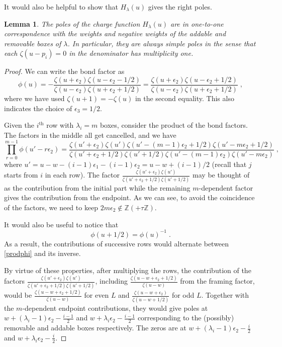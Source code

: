 \documentclass[11pt]{article}
\numberwithin{equation}{section}
\numberwithin{figure}{section}
\numberwithin{table}{section}
\newtheorem{lemma}[theorem]{Lemma}
\begin{document}
It would also be helpful to show that $H_\lambda(u)$ gives the right poles.
\begin{lemma}
	The poles of the charge function $H_\lambda(u)$ are in one-to-one correspondence with the weights and negative weights of the addable and removable boxes of $\lambda$. In particular, they are always simple poles in the sense that each $\zeta(u-p_i)=0$ in the denominator has multiplicity one.
\end{lemma}
\begin{proof}
	We can write the bond factor as
	\begin{equation}
		\phi(u)=-\frac{\zeta(u+\epsilon_2)\zeta(u-\epsilon_2-1/2)}{\zeta(u-\epsilon_2)\zeta(u+\epsilon_2+1/2)}=\frac{\zeta(u+\epsilon_2)\zeta(u-\epsilon_2+1/2)}{\zeta(u-\epsilon_2)\zeta(u+\epsilon_2+1/2)}\;,
	\end{equation}
	where we have used $\zeta(u+1)=-\zeta(u)$ in the second equality. This also indicates the choice of $\epsilon_3=1/2$.

	Given the $i^\text{th}$ row with $\lambda_i=m$ boxes, consider the product of the bond factors. The factors in the middle all get cancelled, and we have
	\begin{equation}
		\prod_{r=0}^{m-1}\phi(u'-r\epsilon_2)=\frac{\zeta(u'+\epsilon_2)\zeta(u')\zeta(u'-(m-1)\epsilon_2+1/2)\zeta(u'-m\epsilon_2+1/2)}{\zeta(u'+\epsilon_2+1/2)\zeta(u'+1/2)\zeta(u'-(m-1)\epsilon_2)\zeta(u'-m\epsilon_2)}\;,\label{prodphi}
	\end{equation}
	where $u'=u-w-(i-1)\epsilon_1-(i-1)\epsilon_2=u-w+(i-1)/2$ (recall that $j$ starts from $i$ in each row). The factor $\frac{\zeta(u'+\epsilon_2)\zeta(u')}{\zeta(u'+\epsilon_2+1/2)\zeta(u'+1/2)}$ may be thought of as the contribution from the initial part while the remaining $m$-dependent factor gives the contribution from the endpoint. As we can see, to avoid the coincidence of the factors, we need to keep $2m\epsilon_2\notin\mathbb{Z}(+\tau\mathbb{Z})$.
	
	It would also be useful to notice that
	\begin{equation}
		\phi(u+1/2)=\phi(u)^{-1}\;.
	\end{equation}
	As a result, the contributions of successive rows would alternate between \eqref{prodphi} and its inverse.

	By virtue of these properties, after multiplying the rows, the contribution of the factors $\frac{\zeta(u'+\epsilon_2)\zeta(u')}{\zeta(u'+\epsilon_2+1/2)\zeta(u'+1/2)}$, including $\frac{\zeta(u-w+\epsilon_2+1/2)}{\zeta(u-w)}$ from the framing factor, would be $\frac{\zeta(u-w+\epsilon_2+1/2)}{\zeta(u-w)}$ for even $L$ and $\frac{\zeta(u-w+\epsilon_2)}{\zeta(u-w+1/2)}$ for odd $L$. Together with the $m$-dependent endpoint contributions, they would give poles at $w+(\lambda_i-1)\epsilon_2-\frac{i-1}{2}$ and $w+\lambda_i\epsilon_2-\frac{i-1}{2}$ corresponding to the (possibly) removable and addable boxes respectively. The zeros are at $w+(\lambda_i-1)\epsilon_2-\frac{i}{2}$ and $w+\lambda_i\epsilon_2-\frac{i}{2}$.


\end{proof}
\end{document}
